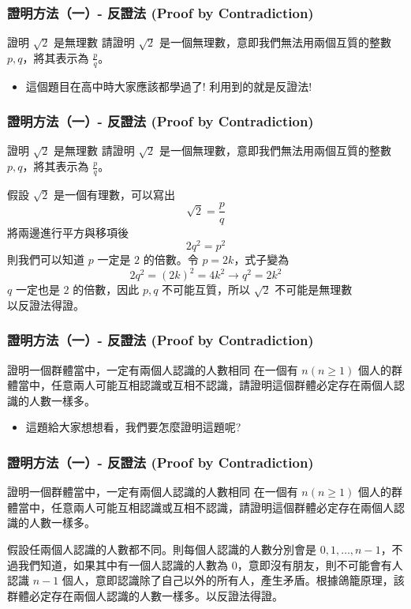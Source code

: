 \documentclass[aspectratio=169]{beamer}
\begin{document}
\begin{frame}
\frametitle{證明方法（一）- 反證法 (Proof by Contradiction)}
    \begin{block}{證明 $\sqrt{2}$ 是無理數}
        請證明 $\sqrt{2}$ 是一個無理數，意即我們無法用兩個互質的整數 $p,q$，將其表示為 $\frac{p}{q}$。
    \end{block}
    
    \begin{itemize}
        \item<1-> 這個題目在高中時大家應該都學過了! 利用到的就是反證法!
    \end{itemize}
\end{frame}

\begin{frame}
\frametitle{證明方法（一）- 反證法 (Proof by Contradiction)}
    \begin{block}{證明 $\sqrt{2}$ 是無理數}
        請證明 $\sqrt{2}$ 是一個無理數，意即我們無法用兩個互質的整數 $p,q$，將其表示為 $\frac{p}{q}$。
    \end{block}
    
    假設 $\sqrt{2}$ 是一個有理數，可以寫出 
    $$\sqrt{2}=\frac{p}{q}$$
    將兩邊進行平方與移項後
    $$2q^2 = p^2$$
    則我們可以知道 $p$ 一定是 $2$ 的倍數。令 $p=2k$，式子變為
    $$2q^2 = (2k)^2 = 4k^2 \rightarrow q^2=2k^2$$
    $q$ 一定也是 $2$ 的倍數，因此 $p,q$ 不可能互質，所以 $\sqrt{2}$ 不可能是無理數 \\
    以反證法得證。
\end{frame}

\begin{frame}
\frametitle{證明方法（一）- 反證法 (Proof by Contradiction)}
    \begin{block}{證明一個群體當中，一定有兩個人認識的人數相同}
        在一個有 $n (n \ge 1)$ 個人的群體當中，任意兩人可能互相認識或互相不認識，請證明這個群體必定存在兩個人認識的人數一樣多。
    \end{block}
    \begin{itemize}
        \item 這題給大家想想看，我們要怎麼證明這題呢?
    \end{itemize}
\end{frame}

\begin{frame}
\frametitle{證明方法（一）- 反證法 (Proof by Contradiction)}
    \begin{block}{證明一個群體當中，一定有兩個人認識的人數相同}
        在一個有 $n (n \ge 1)$ 個人的群體當中，任意兩人可能互相認識或互相不認識，請證明這個群體必定存在兩個人認識的人數一樣多。
    \end{block}
    假設任兩個人認識的人數都不同。則每個人認識的人數分別會是 $0,1,\ldots,n-1$，不過我們知道，如果其中有一個人認識的人數為 $0$，意即沒有朋友，則不可能會有人認識 $n-1$ 個人，意即認識除了自己以外的所有人，產生矛盾。根據鴿籠原理，該群體必定存在兩個人認識的人數一樣多。以反證法得證。
\end{frame}
\end{document}
